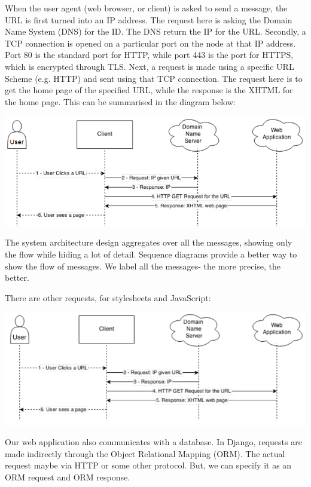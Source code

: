 \documentclass[a4paper, openany]{memoir}
\begin{document}
When the user agent (web browser, or client) is asked to send a message, the URL is first turned into an IP address. The request here is asking the Domain Name System (DNS) for the ID. The DNS return the IP for the URL. Secondly, a TCP connection is opened on a particular port on the node at that IP address. Port 80 is the standard port for HTTP, while port 443 is the port for HTTPS, which is encrypted through TLS. Next, a request is made using a specific URL Scheme (e.g. HTTP) and sent using that TCP connection. The request here is to get the home page of the specified URL, while the response is the XHTML for the home page. This can be summarised in the diagram below:
\begin{center}
    \includegraphics[scale=0.6]{src/L18I1.PNG}
\end{center}
The system architecture design aggregates over all the messages, showing only the flow while hiding a lot of detail. Sequence diagrams provide a better way to show the flow of messages. We label all the messages- the more precise, the better.

There are other requests, for stylesheets and JavaScript:
\begin{center}
    \includegraphics[scale=0.7]{src/L18I2.PNG}
\end{center}
Our web application also communicates with a database. In Django, requests are made indirectly through the Object Relational Mapping (ORM). The actual request maybe via HTTP or some other protocol. But, we can specify it as an ORM request and ORM response.
\end{document}
